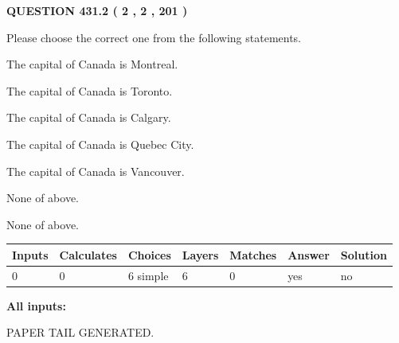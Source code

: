 \documentclass[12pt]{article}
\begin{document}
\vspace{0.2in}
  
{\textbf{\Large{QUESTION
431.2 
 ( 2 , 2 , 201 )
}}}
  
  
Please choose the correct one from the following statements.
 
 
The capital of Canada is Montreal.
 
 
The capital of Canada is Toronto.
 
 
The capital of Canada is Calgary.
 
 
The capital of Canada is Quebec City.
 
 
The capital of Canada is Vancouver.
 
 
 None of above.
 
 
\noindent{}
 
 
 None of above.
 
 
\noindent{}
 
 
   
   
   
   
\noindent\begin{tabular}{|l|l|l|l|l|l|l|}
 \hline
Inputs & Calculates & Choices & Layers & Matches & Answer & Solution \\ \hline
 0  & 
 0  & 
 6
  simple  
  & 
 6  & 
 0  & 
  yes & 
  no 
  \\ \hline
 \end{tabular}
   
   
   
   
\noindent{}
   
   
   
   
\noindent\vspace{0.1in}\hspace{-0.08in} {\textbf{\Large{All inputs: }}}
   
   
   
   
   
   
 \vspace{0.2in}
 
   
   
\vspace{2.0in} PAPER TAIL GENERATED.
   
\end{document}
